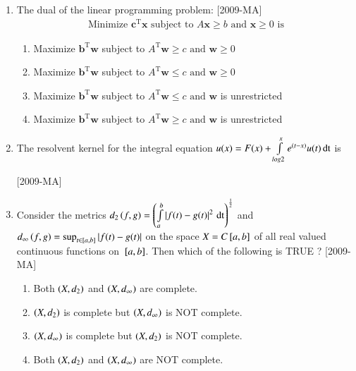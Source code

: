 \documentclass[journal]{IEEEtran}
\begin{document}
\begin{enumerate}
\item The dual of the linear programming problem: \hfill{[2009-MA]}
\begin{align*}
    \text{Minimize } \textbf{c}^{\mathrm{T}}\textbf{x} \text{ subject to } A\textbf{x}\geq b \text{ and } \textbf{x} \geq 0 \text{ is}
\end{align*} 
\begin{enumerate}
    \item Maximize $\textbf{b}^{\mathrm{T}}\textbf{w}$ subject to $A^{\mathrm{T}}\textbf{w}\geq c \text{ and } \textbf{w}\geq 0$ 
    \item Maximize $\textbf{b}^{\mathrm{T}}\textbf{w}$ subject to $A^{\mathrm{T}}\textbf{w}\leq c \text{ and } \textbf{w}\geq 0$ 
    \item Maximize $\textbf{b}^{\mathrm{T}}\textbf{w}$ subject to $A^{\mathrm{T}}\textbf{w}\leq c \text{ and } \textbf{w}$ is unrestricted
    \item Maximize $\textbf{b}^{\mathrm{T}}\textbf{w}$ subject to $A^{\mathrm{T}}\textbf{w}\geq c \text{ and } \textbf{w}$ is unrestricted
\end{enumerate}

\item The resolvent kernel for the integral equation $u(x)=F(x)+\int \limits_{log 2}^x e^{\left(t-x\right)}u(t)\, \text{dt}$ is 
    
     \hfill{[2009-MA]}
\begin{enumerate}
\end{enumerate}

\item Consider the metrics $d_2 \left(f,g\right)=\left(\int \limits_{a}^b \left\vert f(t)-g(t)\right\vert^2\, \text{dt}\right)^\frac{1}{2}$ and $d_{\infty}\left(f,g\right)=\sup_{t \in {}\left[a,b\right]} \left\vert f(t)-g(t)\right\vert$ on the space $X=C{}\left[a,b\right]$ of all real valued continuous functions on ${}\left[a,b\right]$. Then which of the following is TRUE ? \hfill{[2009-MA]}
\begin{enumerate}
    \item Both $\left(X,d_2\right)$ and $\left(X,d_{\infty}\right)$ are complete.
    \item $\left(X,d_2\right)$ is complete but $\left(X,d_{\infty}\right)$ is NOT complete.
    \item $\left(X,d_{\infty}\right)$ is complete but $\left(X,d_2\right)$ is NOT complete.
    \item Both $\left(X,d_2\right)$ and $\left(X,d_{\infty}\right)$ are NOT complete.
\end{enumerate}


\end{enumerate}
\end{document}
